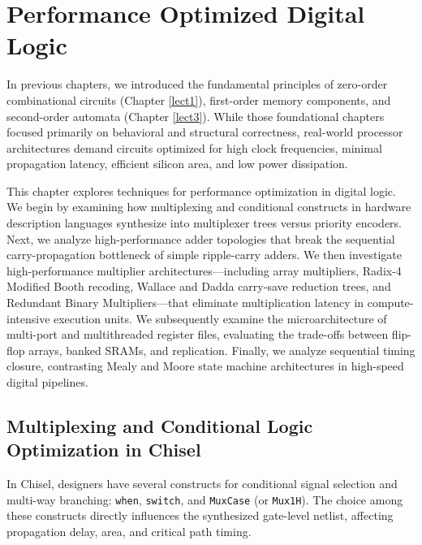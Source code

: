 \chapter{Performance Optimized Digital Logic}\label{chapt:perf_digital_logic}\label{chap:perf_opt_logic}
\localtoc

In previous chapters, we introduced the fundamental principles of zero-order combinational circuits (Chapter \ref{lect1}), first-order memory components, and second-order automata (Chapter \ref{lect3}). While those foundational chapters focused primarily on behavioral and structural correctness, real-world processor architectures demand circuits optimized for high clock frequencies, minimal propagation latency, efficient silicon area, and low power dissipation.

This chapter explores techniques for performance optimization in digital logic. We begin by examining how multiplexing and conditional constructs in hardware description languages synthesize into multiplexer trees versus priority encoders. Next, we analyze high-performance adder topologies that break the sequential carry-propagation bottleneck of simple ripple-carry adders. We then investigate high-performance multiplier architectures---including array multipliers, Radix-4 Modified Booth recoding, Wallace and Dadda carry-save reduction trees, and Redundant Binary Multipliers---that eliminate multiplication latency in compute-intensive execution units. We subsequently examine the microarchitecture of multi-port and multithreaded register files, evaluating the trade-offs between flip-flop arrays, banked SRAMs, and replication. Finally, we analyze sequential timing closure, contrasting Mealy and Moore state machine architectures in high-speed digital pipelines.

\section{Multiplexing and Conditional Logic Optimization in Chisel} \label{sec:muxcase}

In Chisel, designers have several constructs for conditional signal selection and multi-way branching: \texttt{when}, \texttt{switch}, and \texttt{MuxCase} (or \texttt{Mux1H}). The choice among these constructs directly influences the synthesized gate-level netlist, affecting propagation delay, area, and critical path timing.

